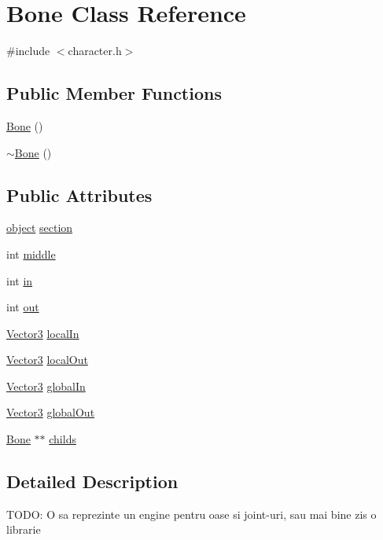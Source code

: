 \hypertarget{class_bone}{\section{Bone Class Reference}
\label{class_bone}
}


{\ttfamily \#include $<$character.\-h$>$}

\subsection*{Public Member Functions}
\begin{DoxyCompactItemize}
\item 
\hyperlink{class_bone_ab0eb429b660fca66be1f97e6cc8de196}{Bone} ()
\item 
\hyperlink{class_bone_a8a85b84508716d1214f7fb69982d917c}{$\sim$\-Bone} ()
\end{DoxyCompactItemize}
\subsection*{Public Attributes}
\begin{DoxyCompactItemize}
\item 
\hyperlink{structobject}{object} \hyperlink{class_bone_a8e2c06c41d28182e494317a9e027f273}{section}
\item 
int \hyperlink{class_bone_abfa4a8f98163370729030745a7f1a6fb}{middle}
\item 
int \hyperlink{class_bone_a49dad9d0358f3a7aba5228243d8c9165}{in}
\item 
int \hyperlink{class_bone_a50dfae7fc1869eee97ef2eeb2602ccd7}{out}
\item 
\hyperlink{struct_vector3}{Vector3} \hyperlink{class_bone_aa011083ee788dc21828a12e16d41b5d9}{local\-In}
\item 
\hyperlink{struct_vector3}{Vector3} \hyperlink{class_bone_abb36ef81c46382b612813bb57eda48a7}{local\-Out}
\item 
\hyperlink{struct_vector3}{Vector3} \hyperlink{class_bone_a792fe0d50a7cd797e96e0418e342f1e8}{global\-In}
\item 
\hyperlink{struct_vector3}{Vector3} \hyperlink{class_bone_a1cf777430424819b626e9b2ae279ebbf}{global\-Out}
\item 
\hyperlink{class_bone}{Bone} $\ast$$\ast$ \hyperlink{class_bone_a15768d6a7d79b8d9d03f8cce8e878de6}{childs}
\end{DoxyCompactItemize}


\subsection{Detailed Description}
T\-O\-D\-O\-: O sa reprezinte un engine pentru oase si joint-\/uri, sau mai bine zis o librarie 

